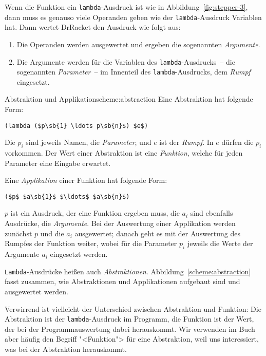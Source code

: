 Wenn die Funktion ein \lstinline{lambda}-Ausdruck ist wie in
Abbildung~\ref{fig:stepper-3}, dann muss es genauso viele Operanden
geben wie der \lstinline{lambda}-Ausdruck Variablen hat.
Dann wertet DrRacket den Ausdruck wie folgt aus:
%
\begin{enumerate}
\item Die Operanden werden ausgewertet und ergeben die sogenannten
  \textit{Argumente}.\label{sec:argument}
\item Die Argumente werden für die
  Variablen des \lstinline{lambda}-Ausdrucks~-- die sogenannten
  \textit{Parameter}~-- im Innenteil des
  \lstinline{lambda}-Ausdrucks, dem \textit{Rumpf}
  eingesetzt.
\end{enumerate}
%
\begin{feature}{Abstraktion und Applikation}{scheme:abstraction}
  Eine Abstraktion hat folgende Form:
\begin{lstlisting}
(lambda ($p\sb{1} \ldots p\sb{n}$) $e$)
\end{lstlisting}
  Die $p_i$ sind jeweils Namen, die \textit{Parameter}, und
  $e$ ist der \textit{Rumpf}.  In $e$ dürfen die $p_i$
  vorkommen.  Der Wert einer Abstraktion ist eine \textit{Funktion},
  welche für jeden Parameter eine Eingabe erwartet.

  Eine \textit{Applikation} einer Funktion hat folgende Form:
\begin{lstlisting}
($p$ $a\sb{1}$ $\ldots$ $a\sb{n}$)
\end{lstlisting}
  $p$ ist ein Ausdruck, der eine Funktion ergeben muss, die $a_i$ sind
  ebenfalls Ausdrücke, die \textit{Argumente}.  Bei
  der Auswertung einer Applikation werden zunächst $p$ und die $a_i$
  ausgewertet; danach geht es mit der Auswertung des Rumpfes der
  Funktion weiter, wobei für die Parameter $p_i$ jeweils die Werte der
  Argumente $a_i$ eingesetzt werden.
\end{feature}
%
\lstinline{Lambda}-Ausdrücke heißen auch
\textit{Abstraktionen}.
Abbildung~\ref{scheme:abstraction} fasst zusammen, wie Abstraktionen
und Applikationen aufgebaut sind und ausgewertet werden.

Verwirrend ist vielleicht der Unterschied zwischen Abstraktion und
Funktion: Die Abstraktion ist der \lstinline{lambda}-Ausdruck im
Programm, die Funktion ist der Wert, der bei der Programmauswertung
dabei herauskommt.  Wir verwenden im Buch aber häufig den Begriff
"<Funktion"> für eine Abstraktion, weil uns interessiert, was bei der
Abstraktion herauskommt.

